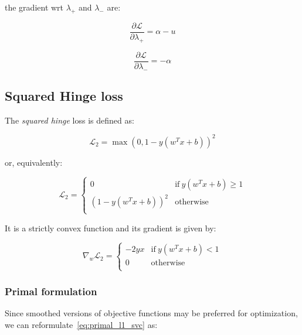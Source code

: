 the gradient wrt $\lambda_+$ and $\lambda_-$ are:

\begin{equation} \label{eq:svc_bcqp_lagrangian_der_lp}
	\frac{\partial \mathcal{L}}{\partial \lambda_+}=\alpha - u
\end{equation}

\begin{equation} \label{eq:svc_bcqp_lagrangian_der_lm}
    \frac{\partial \mathcal{L}}{\partial \lambda_-}=-\alpha
\end{equation}

\pagebreak

\subsection{Squared Hinge loss}

The \emph{squared hinge} loss is defined as:

\begin{equation} \label{eq:squared_hinge_loss2}
	\mathcal{L}_2 = \max(0, 1 - y (w^T x + b))^2
\end{equation}

or, equivalently:

\begin{equation} \label{eq:squared_hinge_loss1}
	\mathcal{L}_2 = 
	\begin{cases}
		0 & \text{if} \ y (w^T x + b) \geq 1 \\
		(1 - y (w^T x + b))^2 & \text{otherwise} \\
	\end{cases}
\end{equation}

It is a strictly convex function and its gradient is given by:

\begin{equation} \label{eq:squared_hinge_loss_der}
    \nabla_w \mathcal{L}_2=
        \begin{cases}
            - 2 y x & \text{if} \ y (w^T x + b) < 1 \\
            0 & \text{otherwise} \\ 
        \end{cases}
\end{equation}

\subsubsection{Primal formulation}

Since smoothed versions of objective functions may be preferred for optimization, we can reformulate~\eqref{eq:primal_l1_svc} as:

